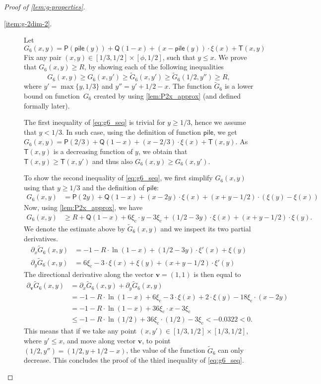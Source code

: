 \documentclass[a4paper,USenglish,cleveref]{lipics-v2019}
\newcommand{\R}{\ensuremath{R}}
\newcommand{\smallBoundary}{\ensuremath{\phi}}
\newcommand{\gconst}{\ensuremath{\xi_\mathrm{c}}}
\newcommand{\g}{\ensuremath{\xi}}
\newcommand{\water}{\textsf{Q}}
\newcommand{\cutintegral}{\textsf{P}}
\newcommand{\stack}{\textsf{pile}}
\newcommand{\vecv}{\mathbf{v}}
\newcommand{\T}{\textsf{T}}
\begin{document}
\begin{proof}[Proof of \cref{lem:g-properties}]
\begin{description}
\item[\cref{item:g-2dim-2}.]
Let 
\[ 
  G_6(x,y) = \cutintegral(\stack(y)) +  \water(1-x) + (x - \stack(y)) \cdot \g(x) + \T(x,y)
\]
Fix any pair $(x,y) \in [1/3, 1/2] \times [\smallBoundary, 1/2]$, such that 
$y \leq x$. We prove that \mbox{$G_6(x,y) \geq \R$}, by showing each of the following
inequalities
\begin{equation}
\label{eq:g6_seq}
  G_6(x,y) \geq G_6(x,y') \geq \tilde{G}_6(x,y') \geq \tilde{G}_6(1/2,y'') \geq \R,
\end{equation}
where $y' = \max\{y, 1/3\}$ and $y'' = y'+1/2-x$. 
The function $\tilde{G}_6$ is a lower bound on function~$G_6$ created
by using \cref{lem:P2x_approx} (and defined formally later).

The first inequality of \eqref{eq:g6_seq} is trivial for $y \geq 1/3$, hence 
we assume that $y < 1/3$. In such case, using the definition of function $\stack$,
we get $G_6(x,y) = \cutintegral(2/3) + \water(1-x) + (x - 2/3) \cdot \g(x) + \T(x,y)$.
As $\T(x,y)$ is a decreasing function of $y$, we obtain that $\T(x,y) \geq \T(x,y')$ 
and thus also $G_6(x,y) \geq G_6(x,y')$.

To show the second inequality  of \eqref{eq:g6_seq}, we first simplify $G_6(x,y)$ 
using that $y \geq 1/3$ and the definition of $\stack$:
\begin{align*}
  G_6(x,y) 
  & = \cutintegral(2 y) + \water(1-x) + (x - 2y) \cdot \g(x) + (x+y-1/2) \cdot (\g(y) - \g(x)) 
\end{align*}
Now, using \cref{lem:P2x_approx}, we have
\begin{align*}
  G_6(x,y) 
  & \geq \R + \water(1-x) + 6 \gconst \cdot y - 3 \gconst + (1/2 - 3y) \cdot \g(x) 
    + (x+y-1/2) \cdot \g(y).
\end{align*}
We denote the estimate above by $\tilde{G}_6(x,y)$ and we inspect its 
two partial derivatives.
\begin{align*}
  \partial_x \tilde{G}_6(x,y) 
  & =  -1 - \R \cdot \ln(1-x) + (1/2 - 3y) \cdot \g'(x) + \g(y) \\
  \partial_y \tilde{G}_6(x,y) 
  & = 6 \gconst - 3 \cdot \g(x) + \g(y) + (x+y-1/2) \cdot \g'(y) 
\end{align*}
The directional derivative along the vector $\vecv = (1,1)$ is then equal to 
\begin{align*}
  \partial_\vecv \tilde{G}_6(x,y) 
  & = \partial_x \tilde{G}_6(x,y) + \partial_y \tilde{G}_6(x,y) \\
  & =  -1 - \R \cdot \ln(1-x) + 6 \gconst - 3 \cdot \g(x) + 2 \cdot \g(y) 
   -18 \gconst \cdot (x - 2y) \\
  & =  -1 - \R \cdot \ln(1-x) + 36 \gconst \cdot x - 3 \gconst \\
  & \leq  -1 - \R \cdot \ln(1/2) + 36 \gconst \cdot (1/2) - 3 \gconst 
    < -0.0322 < 0.
\end{align*}
This means that if we take any point $(x,y') \in [1/3, 1/2] \times [1/3,1/2]$,
where $y' \leq x$, and move along vector $\vecv$, to point $(1/2,y'') = (1/2, y + 1/2 - x)$,
the value of the function $\tilde{G}_6$ can only decrease. This concludes the 
proof of the third inequality of \eqref{eq:g6_seq}. 


\end{description}
\end{proof}
\end{document}
